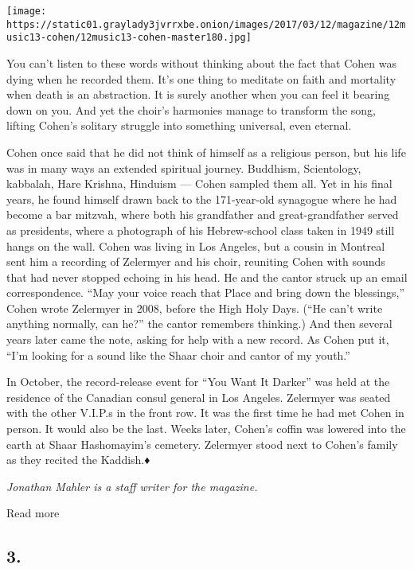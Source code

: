 \texttt{[image: https://static01.graylady3jvrrxbe.onion/images/2017/03/12/magazine/12music13-cohen/12music13-cohen-master180.jpg]}

You can't listen to these words without thinking about the fact that
Cohen was dying when he recorded them. It's one thing to meditate on
faith and mortality when death is an abstraction. It is surely another
when you can feel it bearing down on you. And yet the choir's harmonies
manage to transform the song, lifting Cohen's solitary struggle into
something universal, even eternal.

Cohen once said that he did not think of himself as a religious person,
but his life was in many ways an extended spiritual journey. Buddhism,
Scientology, kabbalah, Hare Krishna, Hinduism --- Cohen sampled them
all. Yet in his final years, he found himself drawn back to the
171-year-old synagogue where he had become a bar mitzvah, where both his
grandfather and great-grandfather served as presidents, where a
photograph of his Hebrew-school class taken in 1949 still hangs on the
wall. Cohen was living in Los Angeles, but a cousin in Montreal sent him
a recording of Zelermyer and his choir, reuniting Cohen with sounds that
had never stopped echoing in his head. He and the cantor struck up an
email correspondence. ``May your voice reach that Place and bring down
the blessings,'' Cohen wrote Zelermyer in 2008, before the High Holy
Days. (``He can't write anything normally, can he?'' the cantor
remembers thinking.) And then several years later came the note, asking
for help with a new record. As Cohen put it, ``I'm looking for a sound
like the Shaar choir and cantor of my youth.''

In October, the record-release event for ``You Want It Darker'' was held
at the residence of the Canadian consul general in Los Angeles.
Zelermyer was seated with the other V.I.P.s in the front row. It was the
first time he had met Cohen in person. It would also be the last. Weeks
later, Cohen's coffin was lowered into the earth at Shaar Hashomayim's
cemetery. Zelermyer stood next to Cohen's family as they recited the
Kaddish.♦

\emph{Jonathan Mahler is a staff writer for the magazine.}

Read more

\hypertarget{3}{%
\subsection{3.}\label{3}}

